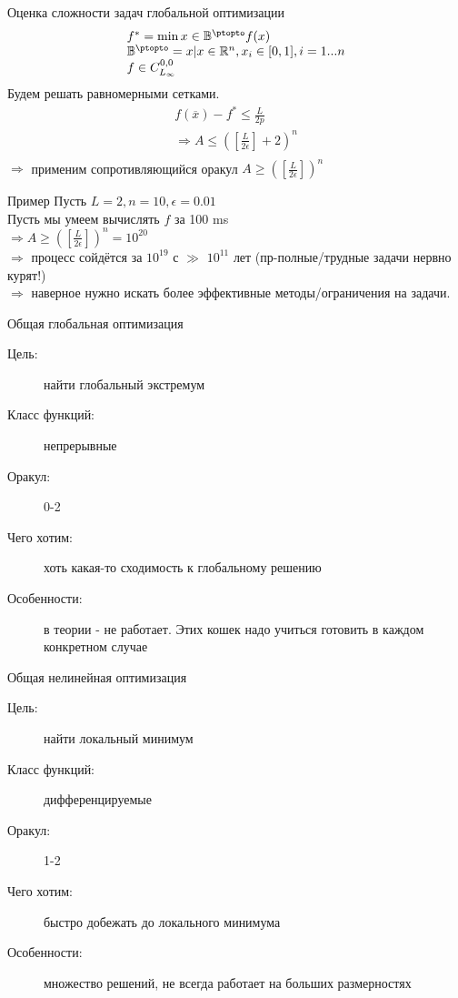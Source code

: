 \documentclass[14pt, fleqn, xcolor={dvipsnames, table}]{beamer}
\begin{document}
\begin{frame}{Оценка сложности задач глобальной оптимизации}
  $$\begin{array}{l}
  f^* = \min x \in \mathbb{B}^{\ptopto} f(x) \\
  \mathbb{B}^{\ptopto} = {x|x \in \mathbb{R}^n, x_i \in [0, 1], i = 1...n} \\
  f \in C_{L_{\infty}}^{0,0} \\
  \end{array}$$
  Будем решать равномерными сетками.
  $$\begin{array}{l}
  f(\overline{x}) - f^* \le \frac{L}{2p} \\
  \Rightarrow A \le ([\frac{L}{2\epsilon}] + 2)^n \\
  \end{array}$$
  $\Rightarrow$ применим сопротивляющийся оракул $A \ge ([\frac{L}{2\epsilon}])^n$
\end{frame}

\begin{frame}{Пример}
  Пусть $L = 2, n = 10, \epsilon = 0.01$ \\
  Пусть мы умеем вычислять $f$ за 100 ms \\
  $\Rightarrow A \ge ([\frac{L}{2\epsilon}])^n = 10^{20}$ \\
  $\Rightarrow$ процесс сойдётся за $10^{19}$ с $\gg$ $10^{11}$ лет (пр-полные/трудные задачи нервно курят!) \\
  $\Rightarrow$ наверное нужно искать более эффективные методы/ограничения на задачи. \\
\end{frame}

\begin{frame}{Общая глобальная оптимизация}
\begin{description}
  \item [\color{blue}Цель:] найти глобальный экстремум
  \item [\color{blue}Класс функций:] непрерывные
  \item [\color{blue}Оракул:] 0-2
  \item [\color{blue}Чего хотим:] хоть какая-то сходимость к глобальному решению
  \item [\color{blue}Особенности:] в теории - не работает. Этих кошек надо учиться готовить в каждом конкретном случае
\end{description}
\end{frame}

\begin{frame}{Общая нелинейная оптимизация}
\begin{description}
  \item [\color{blue}Цель:] найти локальный минимум
  \item [\color{blue}Класс функций:] дифференцируемые
  \item [\color{blue}Оракул:] 1-2
  \item [\color{blue}Чего хотим:] быстро добежать до локального минимума
  \item [\color{blue}Особенности:] множество решений, не всегда работает на больших размерностях
\end{description}
\end{frame}
\end{document}
